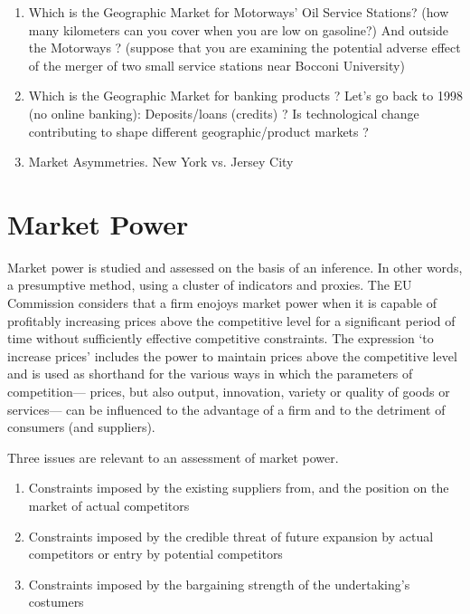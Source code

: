             \begin{enumerate}
                \item Which is the Geographic Market for Motorways’ Oil Service Stations? (how many kilometers can you cover when you are low on gasoline?) And outside the Motorways ? (suppose that you are examining the potential adverse effect of the merger of two small service stations near Bocconi University)
                \item Which is the Geographic Market for banking products ? Let’s go back to 1998 (no online banking): Deposits/loans (credits) ? Is technological change contributing to shape different geographic/product markets ?
                \item Market Asymmetries. New York vs. Jersey City
            \end{enumerate}

\section{Market Power}

    Market power is studied and assessed on the basis of an inference. In other words, a presumptive method, using a cluster of indicators and proxies. The EU Commission considers that a firm enojoys market power when it is capable of profitably increasing prices above the competitive level for a significant period of time without sufficiently effective competitive constraints. The expression ‘to increase prices’ includes the power to maintain prices above the competitive level and is used as shorthand for the various ways in which the parameters of competition— prices, but also output, innovation, variety or quality of goods or services— can be influenced to the advantage of a firm and to the detriment of consumers (and suppliers).

    Three issues are relevant to an assessment of market power.
        \begin{enumerate}
            \item Constraints imposed by the existing suppliers from, and the position on the market of actual competitors
            \item Constraints imposed by the credible threat of future expansion by actual competitors or entry by potential competitors
            \item Constraints imposed by the bargaining strength of the undertaking’s costumers
        \end{enumerate}

